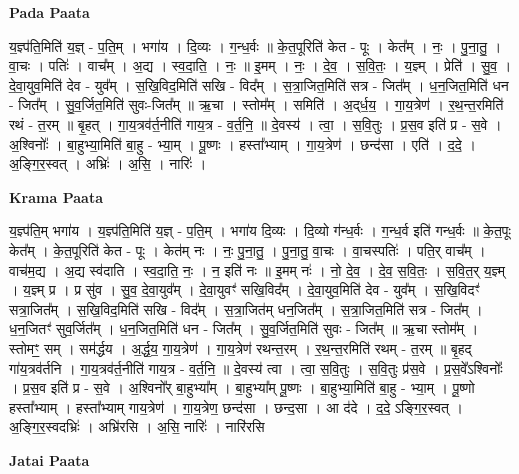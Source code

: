 \documentclass[17pt]{extarticle}
\begin{document}
\textbf{Pada Paata} \newline

य॒ज्ञ्प॑ति॒मिति॑ य॒ज्ञ् - प॒ति॒म् । भगा॑य । दि॒व्यः । ग॒न्ध॒र्वः ॥ के॒त॒पूरिति॑ केत - पूः । केत᳚म् । नः॒ । पु॒ना॒तु॒ । वा॒चः । पतिः॑ । वाच᳚म् । अ॒द्य । स्व॒दा॒ति॒ । नः॒ ॥ इ॒मम् । नः॒ । दे॒व॒ । स॒वि॒तः॒ । य॒ज्ञ्म् । प्रेति॑ । सु॒व॒ । दे॒वा॒युव॒मिति॑ देव - युव᳚म् । स॒खि॒विद॒मिति॑ सखि - विद᳚म् । स॒त्रा॒जित॒मिति॑ सत्र - जित᳚म् । ध॒न॒जित॒मिति॑ धन - जित᳚म् । सु॒व॒र्जित॒मिति॑ सुवः-जित᳚म् ॥ ऋ॒चा । स्तोम᳚म् । समिति॑ । अ॒द्‌र्ध॒य॒ । गा॒य॒त्रेण॑ । र॒थ॒न्त॒रमिति॑ रथं - त॒रम् ॥ बृ॒हत् । गा॒य॒त्रव॑र्त॒नीति॑ गाय॒त्र - व॒र्त॒नि॒ ॥ दे॒वस्य॑ । त्वा॒ । स॒वि॒तुः । प्र॒स॒व इति॑ प्र - स॒वे । अ॒श्विनोः᳚ । बा॒हुभ्या॒मिति॑ बा॒हु - भ्या॒म् । पू॒ष्णः । हस्ता᳚भ्याम् । गा॒य॒त्रेण॑ । छन्द॑सा । एति॑ । द॒दे॒ । अ॒ङ्गि॒र॒स्वत् । अभ्रिः॑ । अ॒सि॒ । नारिः॑ ।  \newline


\textbf{Krama Paata} \newline

य॒ज्ञ्प॑ति॒म् भगा॑य । य॒ज्ञ्प॑ति॒मिति॑ य॒ज्ञ् - प॒ति॒म् । भगा॑य दि॒व्यः । दि॒व्यो ग॑न्ध॒र्वः । ग॒न्ध॒र्व इति॑ गन्ध॒र्वः ॥ के॒त॒पूः केत᳚म् । के॒त॒पूरिति॑ केत - पूः । केत॑म् नः । नः॒ पु॒ना॒तु॒ । पु॒ना॒तु॒ वा॒चः । वा॒चस्पतिः॑ । पति॒र् वाच᳚म् । वाच॑म॒द्य । अ॒द्य स्व॑दाति । स्व॒दा॒ति॒ नः॒ । न॒ इति॑ नः ॥ इ॒मम् नः॑ । नो॒ दे॒व॒ । दे॒व॒ स॒वि॒तः॒ । स॒वि॒त॒र् य॒ज्ञ्म् । य॒ज्ञ्म् प्र । प्र सु॑व । सु॒व॒ दे॒वा॒युव᳚म् । दे॒वा॒युवꣳ॑ सखि॒विद᳚म् । दे॒वा॒युव॒मिति॑ देव - युव᳚म् । स॒खि॒विदꣳ॑ सत्रा॒जित᳚म् । स॒खि॒विद॒मिति॑ सखि - विद᳚म् । स॒त्रा॒जित॑म् धन॒जित᳚म् । स॒त्रा॒जित॒मिति॑ सत्र - जित᳚म् । ध॒न॒जितꣳ॑ सुव॒र्जित᳚म् । ध॒न॒जित॒मिति॑ धन - जित᳚म् । सु॒व॒र्जित॒मिति॑ सुवः - 
जित᳚म् ॥ ऋ॒चा स्तोम᳚म् । स्तोमꣳ॒॒ सम् । सम॑र्द्धय । अ॒र्द्ध॒य॒ गा॒य॒त्रेण॑ । गा॒य॒त्रेण॑ रथन्त॒रम् । र॒थ॒न्त॒रमिति॑ रथम् - त॒रम् ॥ बृ॒हद् गा॑य॒त्रव॑र्तनि । गा॒य॒त्रव॑र्त॒नीति॑ गाय॒त्र - व॒र्त॒नि॒ ॥ दे॒वस्य॑ त्वा । त्वा॒ स॒वि॒तुः । स॒वि॒तुः प्र॑स॒वे । प्र॒स॒वे᳚ऽश्विनोः᳚ । प्र॒स॒व इति॑ प्र - स॒वे । अ॒श्विनो᳚र् बा॒हुभ्या᳚म् । बा॒हुभ्या᳚म् पू॒ष्णः । बा॒हुभ्या॒मिति॑ बा॒हु - भ्या॒म् । पू॒ष्णो हस्ता᳚भ्याम् । हस्ता᳚भ्याम् गाय॒त्रेण॑ । गा॒य॒त्रेण॒ छन्द॑सा । छन्द॒सा । आ द॑दे । द॒दे॒ ऽङ्गि॒र॒स्वत् । अ॒ङ्गि॒र॒स्वदभ्रिः॑ । अभ्रि॑रसि । अ॒सि॒ नारिः॑ । नारि॑रसि \newline

\textbf{Jatai Paata} \newline
\end{document}
